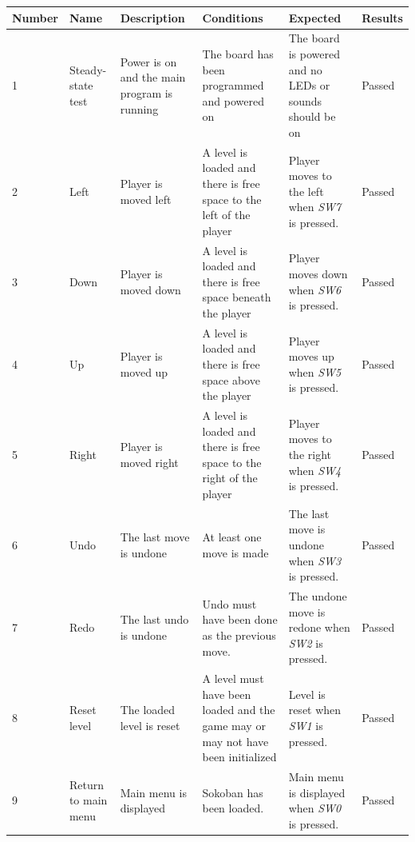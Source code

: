 \documentclass[a4paper,11pt]{article}
\renewcommand{\arraystretch}{1.25} %
\begin{document}
\begin{center}
\footnotesize
\renewcommand{\arraystretch}{1.25} %
\begin{tabular}[pos]{|m{35pt}|m{45pt}|m{80pt}|m{90pt}|m{105pt}|m{40pt}|}
\hline \textbf{Number} & \textbf{Name} & \textbf{Description} & \textbf{Conditions} & \textbf{Expected} & \textbf{Results} \\ 

\hline 1 & Steady-state test & Power is on and the main program is running & The board has been programmed and powered on & The board is powered and no LEDs or sounds should be on & Passed \\

\hline 2 & Left & Player is moved left & A level is loaded and there is free space to the left of the player & Player moves to the left when \emph{SW7} is pressed.  & Passed \\

\hline 3 & Down & Player is moved down & A level is loaded and there is free space beneath the player & Player moves down when \emph{SW6} is pressed.  & Passed \\

\hline 4 & Up & Player is moved up & A level is loaded and there is free space above the player & Player moves up when \emph{SW5} is pressed.  & Passed \\

\hline 5 & Right & Player is moved right & A level is loaded and there is free space to the right of the player & Player moves to the right when \emph{SW4} is pressed.  & Passed \\

\hline 6 & Undo & The last move is undone & At least one move is made & The last move is undone when \emph{SW3} is pressed.  & Passed \\

\hline 7 & Redo & The last undo is undone & Undo must have been done as the previous move. & The undone move is redone when \emph{SW2} is pressed.  & Passed \\

\hline 8 &  Reset level & The loaded level is reset & A level must have been loaded and the game may or may not have been initialized & Level is reset when \emph{SW1} is pressed.  & Passed \\

\hline 9 & Return to main menu & Main menu is displayed & Sokoban has been loaded. & Main menu is displayed when \emph{SW0} is pressed.  & Passed \\


\end{tabular}
\end{center}
\end{document}
